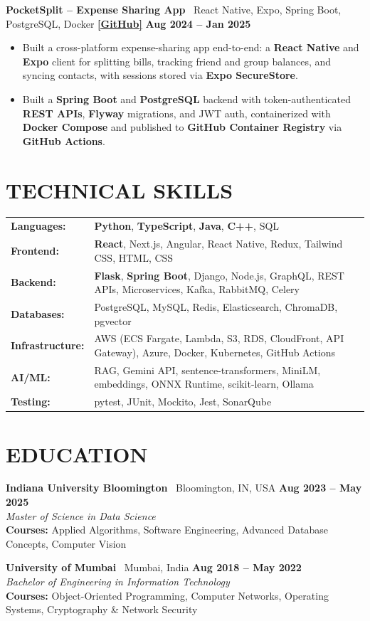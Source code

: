 \documentclass[a4paper,9pt]{extarticle}
\begin{document}
\textbf{PocketSplit -- Expense Sharing App} \textbar\ React Native, Expo, Spring Boot, PostgreSQL, Docker \href{https://github.com/blackhat955/PocketSplit}{\textbf{[GitHub]}} \hfill \textbf{Aug 2024 -- Jan 2025}
\begin{itemize}
  \item Built a cross-platform expense-sharing app end-to-end: a \textbf{React Native} and \textbf{Expo} client for splitting bills, tracking friend and group balances, and syncing contacts, with sessions stored via \textbf{Expo SecureStore}.
  \item Built a \textbf{Spring Boot} and \textbf{PostgreSQL} backend with token-authenticated \textbf{REST APIs}, \textbf{Flyway} migrations, and JWT auth, containerized with \textbf{Docker Compose} and published to \textbf{GitHub Container Registry} via \textbf{GitHub Actions}.
\end{itemize}

\section*{TECHNICAL SKILLS}
\begin{tabular}{@{}p{3.3cm}p{16cm}@{}}
\textbf{Languages:} & \textbf{Python}, \textbf{TypeScript}, \textbf{Java}, \textbf{C++}, SQL \\
\textbf{Frontend:} & \textbf{React}, Next.js, Angular, React Native, Redux, Tailwind CSS, HTML, CSS \\
\textbf{Backend:} & \textbf{Flask}, \textbf{Spring Boot}, Django, Node.js, GraphQL, REST APIs, Microservices, Kafka, RabbitMQ, Celery \\
\textbf{Databases:} & PostgreSQL, MySQL, Redis, Elasticsearch, ChromaDB, pgvector \\
\textbf{Infrastructure:} & AWS (ECS Fargate, Lambda, S3, RDS, CloudFront, API Gateway), Azure, Docker, Kubernetes, GitHub Actions \\
\textbf{AI/ML:} & RAG, Gemini API, sentence-transformers, MiniLM, embeddings, ONNX Runtime, scikit-learn, Ollama \\
\textbf{Testing:} & pytest, JUnit, Mockito, Jest, SonarQube \\
\end{tabular}

\section*{EDUCATION}
\textbf{Indiana University Bloomington} \textbar\ Bloomington, IN, USA \hfill \textbf{Aug 2023 -- May 2025}\\
\textit{Master of Science in Data Science}\\
\textbf{Courses:} Applied Algorithms, Software Engineering, Advanced Database Concepts, Computer Vision

\vspace{0.25em}
\textbf{University of Mumbai} \textbar\ Mumbai, India \hfill \textbf{Aug 2018 -- May 2022}\\
\textit{Bachelor of Engineering in Information Technology}\\
\textbf{Courses:} Object-Oriented Programming, Computer Networks, Operating Systems, Cryptography \& Network Security
\end{document}
